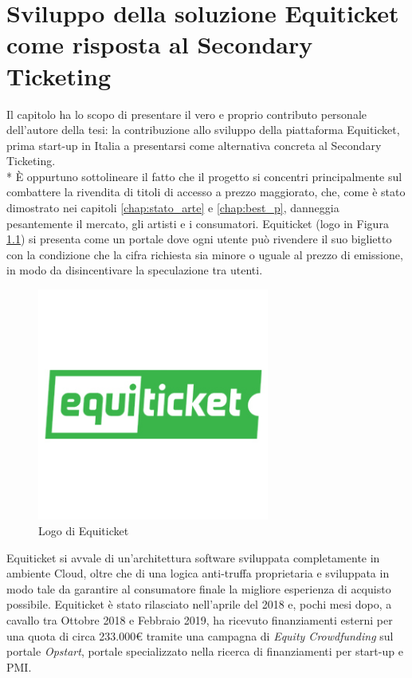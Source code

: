 \chapter{Sviluppo della soluzione Equiticket come risposta al Secondary Ticketing}
\label{chap:equiticket}
Il capitolo ha lo scopo di presentare il vero e proprio contributo personale dell'autore della tesi: la contribuzione allo sviluppo della piattaforma Equiticket, prima start-up in Italia a presentarsi come alternativa concreta al Secondary Ticketing. \\*
\`E oppurtuno sottolineare il fatto che il progetto si concentri principalmente sul combattere la rivendita di titoli di accesso a prezzo maggiorato, che, come è stato dimostrato nei capitoli \ref{chap:stato_arte} e \ref{chap:best_p}, danneggia pesantemente il mercato, gli artisti e i consumatori. 
Equiticket (logo in Figura \ref{logoequi}) si presenta come un portale dove ogni utente può rivendere il suo biglietto con la condizione che la cifra richiesta sia minore o uguale al prezzo di emissione, in modo da disincentivare la speculazione tra utenti. 
\begin{figure}[H]
	\centering
	\includegraphics[width=0.68\textwidth]{chapter4/immagini/logo300}
	\caption{Logo di Equiticket}
	\label{logoequi}
\end{figure}
Equiticket si avvale di un'architettura software sviluppata completamente in ambiente Cloud, oltre che di una logica anti-truffa proprietaria e sviluppata in modo tale da garantire al consumatore finale la migliore esperienza di acquisto possibile. 
Equiticket è stato rilasciato nell'aprile del 2018 e, pochi mesi dopo, a cavallo tra Ottobre 2018 e Febbraio 2019, ha ricevuto finanziamenti esterni per una quota di circa 233.000€ tramite una campagna di \textit{Equity Crowdfunding} sul portale \textit{Opstart}, portale specializzato nella ricerca di finanziamenti per start-up e PMI.
